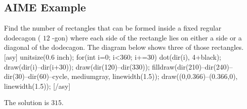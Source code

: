 
\subsection{AIME Example}
\begin{tcolorbox}[title=Question, breakable]

Find the number of rectangles that can be formed inside a fixed regular dodecagon ( $12$ -gon) where each side of the rectangle lies on either a side or a diagonal of the dodecagon. The diagram below shows three of those rectangles. [asy] unitsize(0.6 inch); for(int i=0; i<360; i+=30) { dot(dir(i), 4+black); draw(dir(i)--dir(i+30)); } draw(dir(120)--dir(330)); filldraw(dir(210)--dir(240)--dir(30)--dir(60)--cycle, mediumgray, linewidth(1.5)); draw((0,0.366)--(0.366,0), linewidth(1.5)); [/asy]

\end{tcolorbox}
\begin{tcolorbox}[title=Correct Answer, breakable]

The solution is $\boxed{315}$.

\end{tcolorbox}
